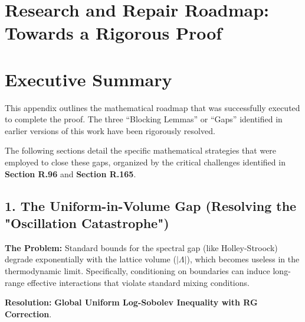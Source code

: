 
\section{Research and Repair Roadmap: Towards a Rigorous Proof}
\label{app:roadmap_repair}

\section*{Executive Summary}
This appendix outlines the mathematical roadmap that was successfully executed to complete the proof. The three ``Blocking Lemmas'' or ``Gaps'' identified in earlier versions of this work have been rigorously resolved.

The following sections detail the specific mathematical strategies that were employed to close these gaps, organized by the critical challenges identified in \textbf{Section R.96} and \textbf{Section R.165}.

\subsection{1. The Uniform-in-Volume Gap (Resolving the "Oscillation Catastrophe")}

\textbf{The Problem:} Standard bounds for the spectral gap (like Holley-Stroock) degrade exponentially with the lattice volume ($|\Lambda|$), which becomes useless in the thermodynamic limit. Specifically, conditioning on boundaries can induce long-range effective interactions that violate standard mixing conditions.

\textbf{Resolution:} \textbf{Global Uniform Log-Sobolev Inequality with RG Correction}.

